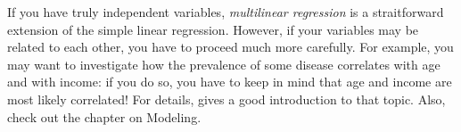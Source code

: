 If you have truly independent variables, \emph{multilinear regression} is a straitforward extension of the simple linear regression. However, if your variables may be related to each other, you have to proceed much more carefully. For example, you may want to investigate how the prevalence of some disease correlates with age and with income: if you do so, you have to keep in mind that age and income are most likely correlated! For details, \cite{Kaplan2009} gives a good introduction to that topic. Also, check out the chapter on Modeling.


